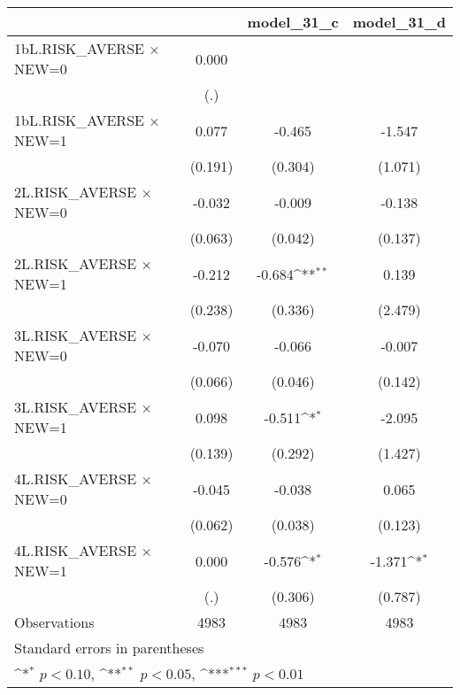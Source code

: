 {
\def\sym#1{\ifmmode^{#1}\else\(^{#1}\)\fi}
\begin{longtable}{l*{3}{c}}
\toprule\endfirsthead\midrule\endhead\midrule\endfoot\endlastfoot
                &\multicolumn{1}{c}{}&\multicolumn{1}{c}{model\_31\_c}&\multicolumn{1}{c}{model\_31\_d}\\
\midrule
1bL.RISK\_AVERSE $\times$ NEW=0&    0.000         &                  &                  \\
                &      (.)         &                  &                  \\
\addlinespace
1bL.RISK\_AVERSE $\times$ NEW=1&    0.077         &   -0.465         &   -1.547         \\
                &  (0.191)         &  (0.304)         &  (1.071)         \\
\addlinespace
2L.RISK\_AVERSE $\times$ NEW=0&   -0.032         &   -0.009         &   -0.138         \\
                &  (0.063)         &  (0.042)         &  (0.137)         \\
\addlinespace
2L.RISK\_AVERSE $\times$ NEW=1&   -0.212         &   -0.684\sym{**} &    0.139         \\
                &  (0.238)         &  (0.336)         &  (2.479)         \\
\addlinespace
3L.RISK\_AVERSE $\times$ NEW=0&   -0.070         &   -0.066         &   -0.007         \\
                &  (0.066)         &  (0.046)         &  (0.142)         \\
\addlinespace
3L.RISK\_AVERSE $\times$ NEW=1&    0.098         &   -0.511\sym{*}  &   -2.095         \\
                &  (0.139)         &  (0.292)         &  (1.427)         \\
\addlinespace
4L.RISK\_AVERSE $\times$ NEW=0&   -0.045         &   -0.038         &    0.065         \\
                &  (0.062)         &  (0.038)         &  (0.123)         \\
\addlinespace
4L.RISK\_AVERSE $\times$ NEW=1&    0.000         &   -0.576\sym{*}  &   -1.371\sym{*}  \\
                &      (.)         &  (0.306)         &  (0.787)         \\
\midrule
Observations    &     4983         &     4983         &     4983         \\
\bottomrule
\multicolumn{4}{l}{\footnotesize Standard errors in parentheses}\\
\multicolumn{4}{l}{\footnotesize \sym{*} \(p<0.10\), \sym{**} \(p<0.05\), \sym{***} \(p<0.01\)}\\
\end{longtable}
}
